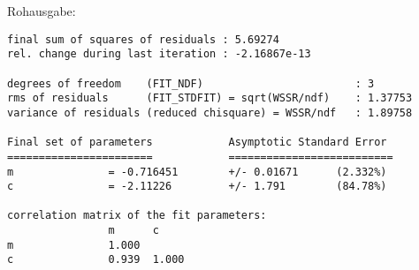     \vspace{-\baselineskip}
    Rohausgabe:
    \begin{verbatim}
final sum of squares of residuals : 5.69274
rel. change during last iteration : -2.16867e-13

degrees of freedom    (FIT_NDF)                        : 3
rms of residuals      (FIT_STDFIT) = sqrt(WSSR/ndf)    : 1.37753
variance of residuals (reduced chisquare) = WSSR/ndf   : 1.89758

Final set of parameters            Asymptotic Standard Error
=======================            ==========================
m               = -0.716451        +/- 0.01671      (2.332%)
c               = -2.11226         +/- 1.791        (84.78%)

correlation matrix of the fit parameters:
                m      c      
m               1.000 
c               0.939  1.000 
    \end{verbatim}
